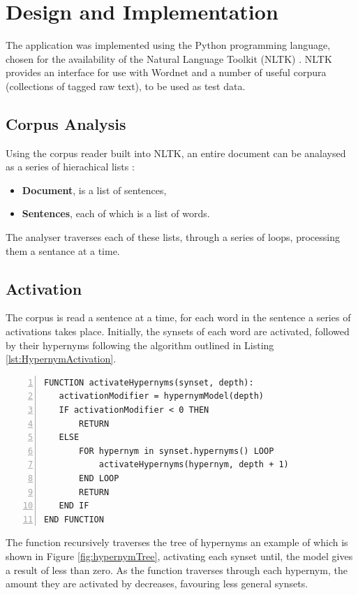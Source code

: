 \documentclass[]{article}
\begin{document}
\section{Design and Implementation}
\label{sec:Implementation}
The application was implemented using the Python programming language, chosen for the availability of the Natural Language Toolkit (NLTK) \cite{NLTK}. NLTK provides an interface for use with Wordnet and a number of useful corpura (collections of tagged raw text), to be used as test data.

\subsection{Corpus Analysis}
\label{sec:CorpusAnalysis}
Using the corpus reader built into NLTK, an entire document can be analaysed as a series of hierachical lists \cite{NLTK}:

\begin{itemize}
	\item \textbf{Document}, is a list of sentences,
	\item \textbf{Sentences}, each of which is a list of words.
\end{itemize}

The analyser traverses each of these lists, through a series of loops, processing them a sentance at a time.

\subsection{Activation}
\label{sec:activation} 

The corpus is read a sentence at a time, for each word in the sentence a series of activations takes place. Initially, the synsets of each word are activated, followed by their hypernyms following the algorithm outlined in Listing \ref{lst:HypernymActivation}.

\begin{lstlisting}[numbers=left, numberstyle=\small, caption={Hypernym Activation}, captionpos=b, label={lst:HypernymActivation}]
FUNCTION activateHypernyms(synset, depth):
   activationModifier = hypernymModel(depth)
   IF activationModifier < 0 THEN
       RETURN
   ELSE
       FOR hypernym in synset.hypernyms() LOOP
           activateHypernyms(hypernym, depth + 1)
       END LOOP
       RETURN
   END IF
END FUNCTION
\end{lstlisting}

The function recursively traverses the tree of hypernyms an example of which is shown in Figure \ref{fig:hypernymTree}, activating each synset until, the model gives a result of less than zero. As the function traverses through each hypernym, the amount they are activated by decreases, favouring less general synsets.
\end{document}
